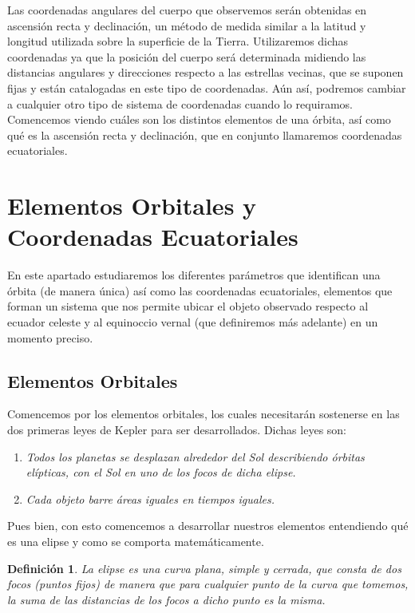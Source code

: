 \documentclass[11pt]{book}
\newtheorem{definition}[theorem]{Definición}
\begin{document}
Las coordenadas angulares del cuerpo que observemos serán obtenidas en ascensión recta y declinación, un método de medida similar a la latitud y longitud utilizada sobre la superficie de la Tierra. Utilizaremos dichas coordenadas ya que la posición del cuerpo será determinada midiendo las distancias angulares y direcciones respecto a las estrellas vecinas, que se suponen fijas y están catalogadas en este tipo de coordenadas. Aún así, podremos cambiar a cualquier otro tipo de sistema de coordenadas cuando lo requiramos.\\

Comencemos viendo cuáles son los distintos elementos de una órbita, así como qué es la ascensión recta y declinación, que en conjunto llamaremos coordenadas ecuatoriales.\\





\section{Elementos Orbitales y Coordenadas Ecuatoriales}
\label{sec:orbital_elements_equatorial_coordinates}
En este apartado estudiaremos los diferentes parámetros que identifican una órbita (de manera única) así como las coordenadas ecuatoriales, elementos que forman un sistema que nos permite ubicar el objeto observado respecto al ecuador celeste y al equinoccio vernal (que definiremos más adelante) en un momento preciso.\\

\subsection{Elementos Orbitales}
\label{subsec:orbital_elements}
Comencemos por los elementos orbitales, los cuales necesitarán sostenerse en las dos primeras leyes de Kepler para ser desarrollados. Dichas leyes son:

\begin{enumerate}
\item \textit{Todos los planetas se desplazan alrededor del Sol describiendo órbitas elípticas, con el Sol en uno de los focos de dicha elipse.}
\item \textit{Cada objeto barre áreas iguales en tiempos iguales.}
\end{enumerate}

Pues bien, con esto comencemos a desarrollar nuestros elementos entendiendo qué es una elipse y como se comporta matemáticamente.
\begin{definition}
La elipse es una curva plana, simple y cerrada, que consta de dos focos (puntos fijos) de manera que para cualquier punto de la curva que tomemos, la suma de las distancias de los focos a dicho punto es la misma.
\end{definition}
\end{document}
